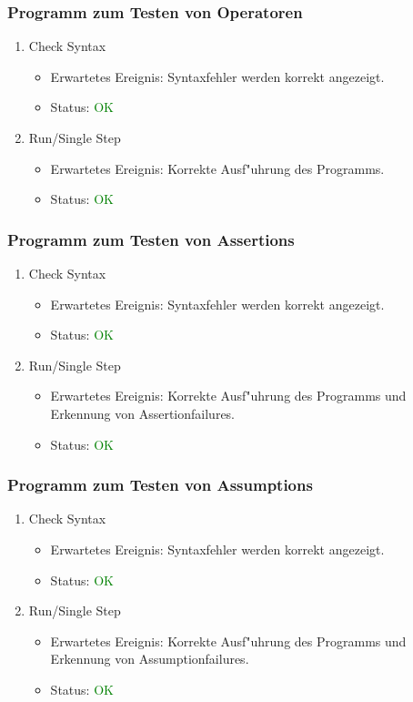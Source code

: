 \subsubsection{Programm zum Testen von Operatoren}
\begin{enumerate}
\item Check Syntax
\begin{itemize}
\item Erwartetes Ereignis: Syntaxfehler werden korrekt angezeigt.
\item Status: \textcolor{green}{OK}
\end{itemize}
\item Run/Single Step
\begin{itemize}
\item Erwartetes Ereignis: Korrekte Ausf"uhrung des Programms.
\item Status: \textcolor{green}{OK}
\end{itemize}
\end{enumerate}
\subsubsection{Programm zum Testen von Assertions}
\begin{enumerate}
\item Check Syntax
\begin{itemize}
\item Erwartetes Ereignis: Syntaxfehler werden korrekt angezeigt.
\item Status: \textcolor{green}{OK}
\end{itemize}
\item Run/Single Step
\begin{itemize}
\item Erwartetes Ereignis: Korrekte Ausf"uhrung des Programms und Erkennung von Assertionfailures.
\item Status: \textcolor{green}{OK}
\end{itemize}
\end{enumerate}
\subsubsection{Programm zum Testen von Assumptions}
\begin{enumerate}
\item Check Syntax
\begin{itemize}
\item Erwartetes Ereignis: Syntaxfehler werden korrekt angezeigt.
\item Status: \textcolor{green}{OK}
\end{itemize}
\item Run/Single Step
\begin{itemize}
\item Erwartetes Ereignis: Korrekte Ausf"uhrung des Programms und Erkennung von Assumptionfailures.
\item Status: \textcolor{green}{OK}
\end{itemize}
\end{enumerate}
